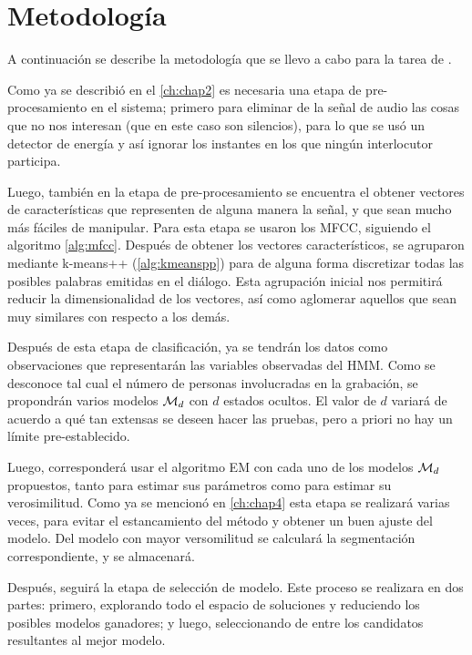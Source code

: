
\chapter{Metodología}\label{ch:chap5}


A continuación se describe la metodología que se llevo a cabo para la tarea de \sd. 

Como ya se describió en el \autoref{ch:chap2} es necesaria una etapa de pre-procesamiento en el sistema; primero para eliminar de la señal de audio las cosas que no nos interesan (que en este caso son silencios), para lo que se usó un detector de energía y así ignorar los instantes en los que ningún interlocutor participa. 

Luego, también en la etapa de pre-procesamiento se encuentra el obtener vectores de características que representen de alguna manera la señal, y que sean mucho más fáciles de manipular. Para esta etapa se usaron los \ac{MFCC}, siguiendo el algoritmo \autoref{alg:mfcc}.  Después de obtener los vectores característicos, se agruparon mediante k-means++ (\autoref{alg:kmeanspp}) para de alguna forma discretizar todas las posibles palabras emitidas en el diálogo. Esta agrupación inicial nos permitirá reducir la dimensionalidad de los vectores, así como aglomerar aquellos que sean muy similares con respecto a los demás.

Después de esta etapa de clasificación, ya se tendrán los datos como observaciones que representarán las variables observadas del \ac{HMM}. Como se desconoce tal cual el número de personas involucradas en la grabación, se propondrán varios modelos $\mathcal{M}_d$ con $d$ estados ocultos. El valor de $d$ variará de acuerdo a qué tan extensas se deseen hacer las pruebas, pero a priori no hay un límite pre-establecido. 

Luego, corresponderá usar el algoritmo \ac{EM} con cada uno de los modelos $\mathcal{M}_d$ propuestos, tanto para estimar sus parámetros como para estimar su verosimilitud. Como ya se mencionó en \autoref{ch:chap4} esta etapa se realizará varias veces, para evitar el estancamiento del método y obtener un buen ajuste del modelo. Del modelo con mayor versomilitud se calculará la segmentación correspondiente, y se almacenará. 

Después, seguirá la etapa de selección de modelo. Este proceso se realizara en dos partes: primero, explorando todo el espacio de soluciones y reduciendo los posibles modelos ganadores; y luego, seleccionando de entre los candidatos resultantes al mejor modelo.

